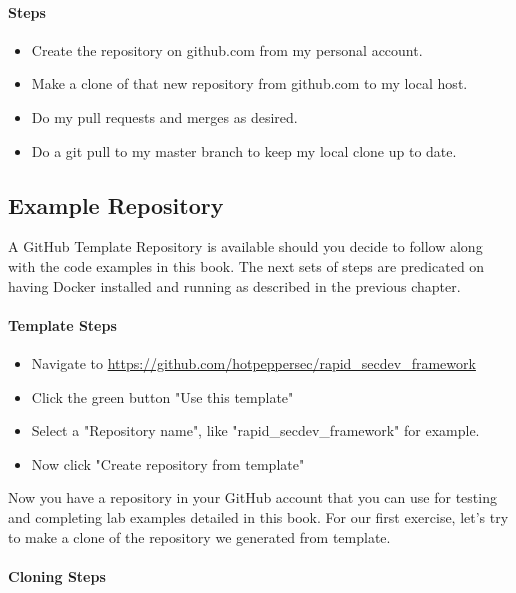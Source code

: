 \hypertarget{steps-2}{%
\paragraph{Steps}\label{steps-2}}

\begin{itemize}

\item
  Create the repository on github.com from my personal account.
\item
  Make a clone of that new repository from github.com to my local host.
\item
  Do my pull requests and merges as desired.
\item
  Do a git pull to my master branch to keep my local clone up to date.
\end{itemize}


\subsection{Example Repository}

\justify
A GitHub Template Repository is available should you decide to follow
along with the code examples in this book. The next sets of steps are
predicated on having Docker installed and running as described in the
previous chapter.


\paragraph{Template Steps}

\begin{itemize}

\item
  Navigate to
  \url{https://github.com/hotpeppersec/rapid_secdev_framework}
\item
  Click the green button "Use this template"
\item
  Select a "Repository name", like "rapid\_secdev\_framework" for
  example.
\item
  Now click "Create repository from template"
\end{itemize}

\justify
Now you have a repository in your GitHub account that you can use for
testing and completing lab examples detailed in this book. For our first
exercise, let's try to make a clone of the repository we generated from
template.


\paragraph{Cloning Steps}

